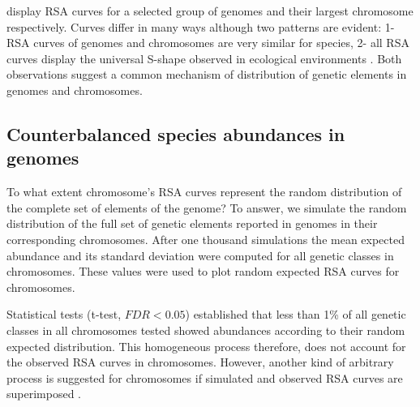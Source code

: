  display RSA curves for a selected group of genomes and their largest chromosome respectively. Curves differ in many ways although two patterns are evident: 1- RSA curves of genomes and chromosomes are very similar for species, 2- all RSA curves display the universal S-shape observed in ecological environments \cite{McGill2007,Hubbell2001}. Both observations suggest a common mechanism of distribution of genetic elements in genomes and chromosomes.

\subsection{Counterbalanced species abundances in genomes}

To what extent chromosome's RSA curves represent the random distribution of the complete set of elements of the genome? To answer, we simulate the random distribution of the full set of genetic elements reported in genomes in their corresponding chromosomes. After one thousand simulations the mean expected abundance and its standard deviation were computed for all genetic classes in chromosomes. These values were used to plot random expected RSA curves for chromosomes.

Statistical tests (t-test, $FDR<0.05$) established that less than 1\% of all genetic classes in all chromosomes tested showed abundances according to their random expected distribution. This homogeneous process therefore, does not account for the observed RSA curves in chromosomes. However, another kind of arbitrary process is suggested for chromosomes if simulated and observed RSA curves are superimposed .

